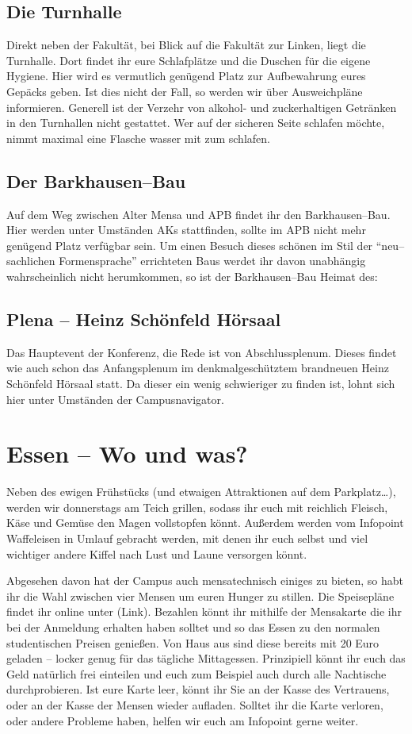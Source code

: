 \subsection*{Die Turnhalle}
Direkt neben der Fakultät, bei Blick auf die Fakultät zur Linken, liegt die Turnhalle.
Dort findet ihr eure Schlafplätze und die Duschen für die eigene Hygiene.
Hier wird es vermutlich genügend Platz zur Aufbewahrung eures Gepäcks geben.
Ist dies nicht der Fall, so werden wir über Ausweichpläne informieren.
Generell ist der Verzehr von alkohol- und zuckerhaltigen Getränken in den Turnhallen nicht gestattet.
Wer auf der sicheren Seite schlafen möchte, nimmt maximal eine Flasche wasser mit zum schlafen.

\subsection*{Der Barkhausen--Bau}
Auf dem Weg zwischen Alter Mensa und APB findet ihr den Barkhausen--Bau.
Hier werden unter Umständen AKs stattfinden, sollte im APB nicht mehr genügend Platz verfügbar sein.
Um einen Besuch dieses schönen im Stil der \enquote{neu--sachlichen Formensprache} errichteten Baus werdet ihr davon unabhängig wahrscheinlich nicht herumkommen, so ist der Barkhausen--Bau Heimat des:

\subsection*{Plena -- Heinz Schönfeld Hörsaal}
Das Hauptevent der Konferenz, die Rede ist von Abschlussplenum.
Dieses findet wie auch schon das Anfangsplenum im denkmalgeschütztem brandneuen Heinz Schönfeld Hörsaal statt.
Da dieser ein wenig schwieriger zu finden ist, lohnt sich hier unter Umständen der Campusnavigator.

\section*{Essen -- Wo und was?}
Neben des ewigen Frühstücks (und etwaigen Attraktionen auf dem Parkplatz…), werden wir donnerstags am Teich grillen, sodass ihr euch mit reichlich Fleisch, Käse und Gemüse den Magen vollstopfen könnt.
Außerdem werden vom Infopoint Waffeleisen in Umlauf gebracht werden, mit denen ihr euch selbst und viel wichtiger andere Kiffel nach Lust und Laune versorgen könnt.

Abgesehen davon hat der Campus auch mensatechnisch einiges zu bieten, so habt ihr die Wahl zwischen vier Mensen um euren Hunger zu stillen.
Die Speisepläne findet ihr online unter (Link).
Bezahlen könnt ihr mithilfe der Mensakarte die ihr bei der Anmeldung erhalten haben solltet und so das Essen zu den normalen studentischen Preisen genießen.
Von Haus aus sind diese bereits mit 20 Euro geladen -- locker genug für das tägliche Mittagessen.
Prinzipiell könnt ihr euch das Geld natürlich frei einteilen und euch zum Beispiel auch durch alle Nachtische durchprobieren.
Ist eure Karte leer, könnt ihr Sie an der Kasse des Vertrauens, oder an der Kasse der Mensen wieder aufladen.
Solltet ihr die Karte verloren, oder andere Probleme haben, helfen wir euch am Infopoint gerne weiter.

